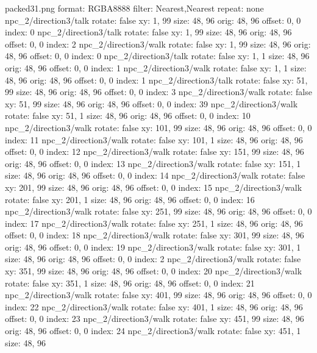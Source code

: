 packed31.png
format: RGBA8888
filter: Nearest,Nearest
repeat: none
npc_2/direction3/talk
  rotate: false
  xy: 1, 99
  size: 48, 96
  orig: 48, 96
  offset: 0, 0
  index: 0
npc_2/direction3/talk
  rotate: false
  xy: 1, 99
  size: 48, 96
  orig: 48, 96
  offset: 0, 0
  index: 2
npc_2/direction3/walk
  rotate: false
  xy: 1, 99
  size: 48, 96
  orig: 48, 96
  offset: 0, 0
  index: 0
npc_2/direction3/talk
  rotate: false
  xy: 1, 1
  size: 48, 96
  orig: 48, 96
  offset: 0, 0
  index: 1
npc_2/direction3/walk
  rotate: false
  xy: 1, 1
  size: 48, 96
  orig: 48, 96
  offset: 0, 0
  index: 1
npc_2/direction3/talk
  rotate: false
  xy: 51, 99
  size: 48, 96
  orig: 48, 96
  offset: 0, 0
  index: 3
npc_2/direction3/walk
  rotate: false
  xy: 51, 99
  size: 48, 96
  orig: 48, 96
  offset: 0, 0
  index: 39
npc_2/direction3/walk
  rotate: false
  xy: 51, 1
  size: 48, 96
  orig: 48, 96
  offset: 0, 0
  index: 10
npc_2/direction3/walk
  rotate: false
  xy: 101, 99
  size: 48, 96
  orig: 48, 96
  offset: 0, 0
  index: 11
npc_2/direction3/walk
  rotate: false
  xy: 101, 1
  size: 48, 96
  orig: 48, 96
  offset: 0, 0
  index: 12
npc_2/direction3/walk
  rotate: false
  xy: 151, 99
  size: 48, 96
  orig: 48, 96
  offset: 0, 0
  index: 13
npc_2/direction3/walk
  rotate: false
  xy: 151, 1
  size: 48, 96
  orig: 48, 96
  offset: 0, 0
  index: 14
npc_2/direction3/walk
  rotate: false
  xy: 201, 99
  size: 48, 96
  orig: 48, 96
  offset: 0, 0
  index: 15
npc_2/direction3/walk
  rotate: false
  xy: 201, 1
  size: 48, 96
  orig: 48, 96
  offset: 0, 0
  index: 16
npc_2/direction3/walk
  rotate: false
  xy: 251, 99
  size: 48, 96
  orig: 48, 96
  offset: 0, 0
  index: 17
npc_2/direction3/walk
  rotate: false
  xy: 251, 1
  size: 48, 96
  orig: 48, 96
  offset: 0, 0
  index: 18
npc_2/direction3/walk
  rotate: false
  xy: 301, 99
  size: 48, 96
  orig: 48, 96
  offset: 0, 0
  index: 19
npc_2/direction3/walk
  rotate: false
  xy: 301, 1
  size: 48, 96
  orig: 48, 96
  offset: 0, 0
  index: 2
npc_2/direction3/walk
  rotate: false
  xy: 351, 99
  size: 48, 96
  orig: 48, 96
  offset: 0, 0
  index: 20
npc_2/direction3/walk
  rotate: false
  xy: 351, 1
  size: 48, 96
  orig: 48, 96
  offset: 0, 0
  index: 21
npc_2/direction3/walk
  rotate: false
  xy: 401, 99
  size: 48, 96
  orig: 48, 96
  offset: 0, 0
  index: 22
npc_2/direction3/walk
  rotate: false
  xy: 401, 1
  size: 48, 96
  orig: 48, 96
  offset: 0, 0
  index: 23
npc_2/direction3/walk
  rotate: false
  xy: 451, 99
  size: 48, 96
  orig: 48, 96
  offset: 0, 0
  index: 24
npc_2/direction3/walk
  rotate: false
  xy: 451, 1
  size: 48, 96
